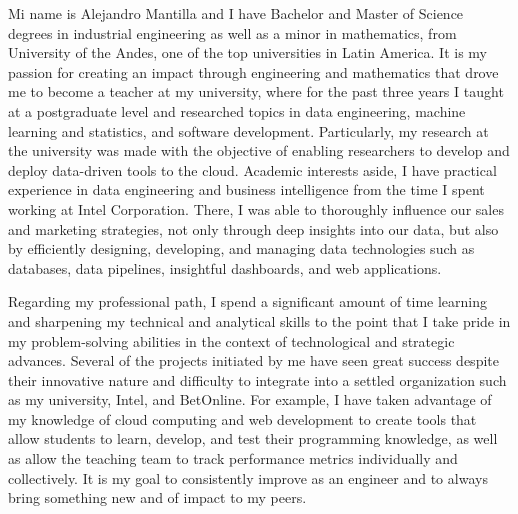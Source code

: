 \documentclass[11pt, a4paper]{awesome-cv}
\begin{document}
\makecvheader[R]


\makelettertitle{}

\begin{cvletter}


	Mi name is Alejandro Mantilla and I have Bachelor and Master of Science degrees in industrial engineering as well as a minor in mathematics, from University of the Andes, one of the top universities in Latin America. It is my passion for creating an impact through engineering and mathematics that drove me to become a teacher at my university, where for the past three years I taught at a postgraduate level and researched topics in data engineering, machine learning and statistics, and software development. Particularly, my research at the university was made with the objective of enabling researchers to develop and deploy data-driven tools to the cloud. Academic interests aside, I have practical experience in data engineering and business intelligence from the time I spent working at Intel Corporation. There, I was able to thoroughly influence our sales and marketing strategies, not only through deep insights into our data, but also by efficiently designing, developing, and managing data technologies such as databases, data pipelines, insightful dashboards, and web applications.

	Regarding my professional path, I spend a significant amount of time learning and sharpening my technical and analytical skills to the point that I take pride in my problem-solving abilities in the context of technological and strategic advances. Several of the projects initiated by me have seen great success despite their innovative nature and difficulty to integrate into a settled organization such as my university, Intel, and BetOnline. For example, I have taken advantage of my knowledge of cloud computing and web development to create tools that allow students to learn, develop, and test their programming knowledge, as well as allow the teaching team to track performance metrics individually and collectively. It is my goal to consistently improve as an engineer and to always bring something new and of impact to my peers.


\end{cvletter}
\end{document}
